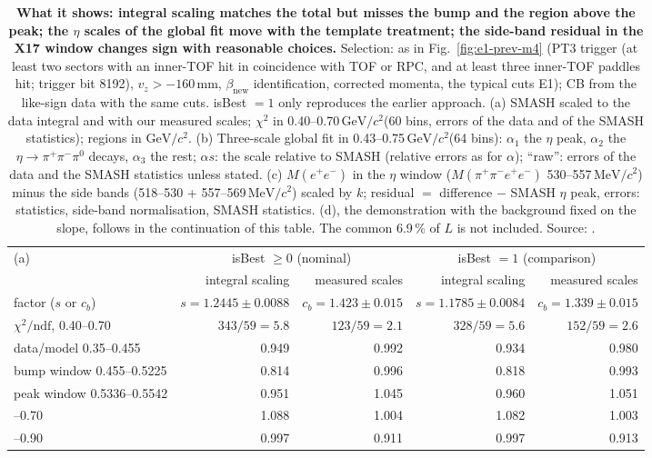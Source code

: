 \documentclass[11pt,a4paper]{article}
\renewcommand{\arraystretch}{1.15}
\newcommand{\piz}{\ensuremath{\pi^{0}}\xspace}
\newcommand{\pipi}{\ensuremath{\pi^{+}\pi^{-}}\xspace}
\newcommand{\Mfour}{\ensuremath{M(\pi^{+}\pi^{-}e^{+}e^{-})}\xspace}
\newcommand{\Mee}{\ensuremath{M(e^{+}e^{-})}\xspace}
\newcommand{\GeVcc}{\ensuremath{\mathrm{GeV}/c^{2}}\xspace}
\newcommand{\MeVcc}{\ensuremath{\mathrm{MeV}/c^{2}}\xspace}
\newcommand{\code}[1]{\texttt{\detokenize{#1}}}
\newcommand{\vz}{\ensuremath{v_z}\xspace}
\newcommand{\betanew}{\ensuremath{\beta_{\mathrm{new}}}\xspace}
\newcommand{\cs}[1]{\textsf{#1}}%
\newcommand{\ptthreecap}{PT3 trigger (at least two sectors with an inner-TOF hit in coincidence with TOF or RPC, and at least three inner-TOF paddles hit; trigger bit 8192)}%
\begin{document}
\begin{table}[tbp]
\centering
\caption{\textbf{What it shows: integral scaling matches the total but misses the bump and the region above the peak; the $\eta$ scales of the
global fit move with the template treatment; the side-band residual in the X17 window changes sign with reasonable choices.}
Selection: as in Fig.~\ref{fig:e1-prev-m4} (\ptthreecap{}, $\vz>-160$\,mm, \betanew identification, corrected momenta, the typical cuts
\cs{E1}); CB from the like-sign data with the same cuts. isBest $=1$ only reproduces the earlier approach. (a) SMASH scaled to the data
integral and with our measured scales; $\chi^2$ in 0.40--0.70\,\GeVcc (60 bins, errors of the data and of the SMASH statistics); regions in \GeVcc.
(b) Three-scale global fit in 0.43--0.75\,\GeVcc (64 bins): $\alpha_1$ the $\eta$ peak, $\alpha_2$ the $\eta\to\pipi\piz$ decays, $\alpha_3$
the rest; $\alpha s$: the scale relative to SMASH (relative errors as for $\alpha$); ``raw'': errors of the data and the SMASH statistics unless
stated. (c) \Mee in the $\eta$ window (\Mfour 530--557\,\MeVcc) minus the side bands (518--530 + 557--569\,\MeVcc) scaled by $k$; residual $=$ difference $-$ SMASH $\eta$ peak, errors:
statistics, side-band normalisation, SMASH statistics. (d), the demonstration with the background fixed on the slope, follows in the
continuation of this table. The common 6.9\,\% of $L$ is not included. Source: \code{prevstyle_results.md}.}
\label{tab:e1prev}
\footnotesize
\setlength{\tabcolsep}{4pt}\renewcommand{\arraystretch}{1.05}
\begin{tabular}{@{}l r r r r@{}}
\toprule
(a) & \multicolumn{2}{c}{isBest $\ge0$ (nominal)} & \multicolumn{2}{c}{isBest $=1$ (comparison)} \\
\cmidrule(lr){2-3}\cmidrule(lr){4-5}
 & integral scaling & measured scales & integral scaling & measured scales \\
\midrule
factor ($s$ or $c_b$) & $s=1.2445\pm0.0088$ & $c_b=1.423\pm0.015$ & $s=1.1785\pm0.0084$ & $c_b=1.339\pm0.015$ \\
$\chi^2/\mathrm{ndf}$, 0.40--0.70 & $343/59=5.8$ & $123/59=2.1$ & $328/59=5.6$ & $152/59=2.6$ \\
data/model 0.35--0.455 & 0.949 & 0.992 & 0.934 & 0.980 \\
\quad bump window 0.455--0.5225 & 0.814 & 0.996 & 0.818 & 0.993 \\
\quad peak window 0.5336--0.5542 & 0.951 & 1.045 & 0.960 & 1.051 \\
\quad 0.56--0.70 & 1.088 & 1.004 & 1.082 & 1.003 \\
\quad 0.70--0.90 & 0.997 & 0.911 & 0.997 & 0.913 \\
\bottomrule
\end{tabular}


\end{table}
\end{document}
